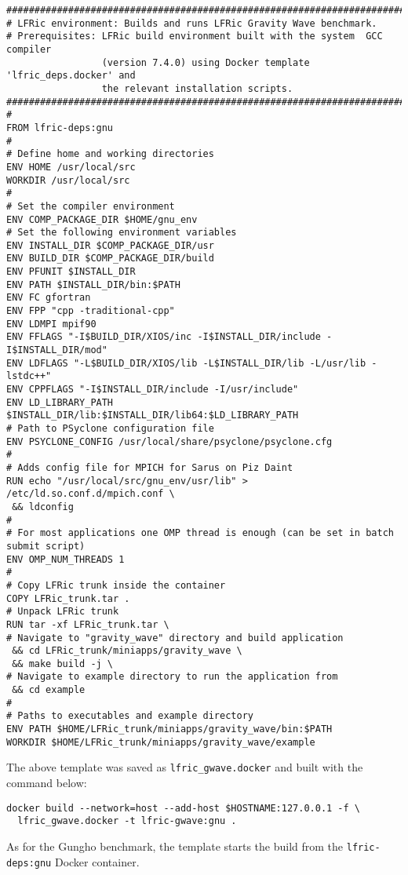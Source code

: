 \documentclass[twoside,a4paper,12pt]{article}
\begin{document}
\begin{Verbatim}[fontsize=\small]
#################################################################################
# LFRic environment: Builds and runs LFRic Gravity Wave benchmark.
# Prerequisites: LFRic build environment built with the system  GCC compiler
                 (version 7.4.0) using Docker template 'lfric_deps.docker' and
                 the relevant installation scripts.
#################################################################################
#
FROM lfric-deps:gnu
#
# Define home and working directories
ENV HOME /usr/local/src
WORKDIR /usr/local/src
#
# Set the compiler environment
ENV COMP_PACKAGE_DIR $HOME/gnu_env
# Set the following environment variables
ENV INSTALL_DIR $COMP_PACKAGE_DIR/usr
ENV BUILD_DIR $COMP_PACKAGE_DIR/build
ENV PFUNIT $INSTALL_DIR
ENV PATH $INSTALL_DIR/bin:$PATH
ENV FC gfortran
ENV FPP "cpp -traditional-cpp"
ENV LDMPI mpif90
ENV FFLAGS "-I$BUILD_DIR/XIOS/inc -I$INSTALL_DIR/include -I$INSTALL_DIR/mod"
ENV LDFLAGS "-L$BUILD_DIR/XIOS/lib -L$INSTALL_DIR/lib -L/usr/lib -lstdc++"
ENV CPPFLAGS "-I$INSTALL_DIR/include -I/usr/include"
ENV LD_LIBRARY_PATH $INSTALL_DIR/lib:$INSTALL_DIR/lib64:$LD_LIBRARY_PATH
# Path to PSyclone configuration file
ENV PSYCLONE_CONFIG /usr/local/share/psyclone/psyclone.cfg
#
# Adds config file for MPICH for Sarus on Piz Daint
RUN echo "/usr/local/src/gnu_env/usr/lib" > /etc/ld.so.conf.d/mpich.conf \
 && ldconfig
#
# For most applications one OMP thread is enough (can be set in batch submit script)
ENV OMP_NUM_THREADS 1
#
# Copy LFRic trunk inside the container
COPY LFRic_trunk.tar .
# Unpack LFRic trunk
RUN tar -xf LFRic_trunk.tar \
# Navigate to "gravity_wave" directory and build application
 && cd LFRic_trunk/miniapps/gravity_wave \
 && make build -j \
# Navigate to example directory to run the application from
 && cd example
#
# Paths to executables and example directory
ENV PATH $HOME/LFRic_trunk/miniapps/gravity_wave/bin:$PATH
WORKDIR $HOME/LFRic_trunk/miniapps/gravity_wave/example
\end{Verbatim}

The above template was saved as \texttt{lfric\_gwave.docker} and built with the
command below:

\begin{Verbatim}[fontsize=\small]
docker build --network=host --add-host $HOSTNAME:127.0.0.1 -f \
  lfric_gwave.docker -t lfric-gwave:gnu .
\end{Verbatim}

As for the Gungho benchmark, the template starts the build from the
\texttt{lfric-deps:gnu} Docker container.
%
%
\end{document}
